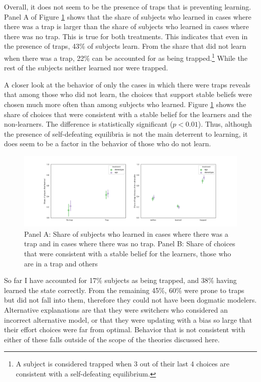 \documentclass[
  12pt,
]{article}
\begin{document}
Overall, it does not seem to be the presence of traps that is preventing
learning. Panel A of Figure \ref{fig:traps-choice} shows that the share
of subjects who learned in cases where there was a trap is larger than
the share of subjects who learned in cases where there was no trap. This
is true for both treatments. This indicates that even in the presence of
traps, 43\% of subjects learn. From the share that did not learn when
there was a trap, 22\% can be accounted for as being
trapped.\footnote{A subject is considered trapped when 3 out of their last 4 choices are consistent with 
a self-defeating equilibrium.} While the rest of the subjects neither
learned nor were trapped.

A closer look at the behavior of only the cases in which there were
traps reveals that among those who did not learn, the choices that
support stable beliefs were chosen much more often than among subjects
who learned. Figure \ref{fig:traps-choice} shows the share of choices
that were consistent with a stable belief for the learners and the
non-learners. The difference is statistically significant (\(p<0.01\)).
Thus, although the presence of self-defeating equilibria is not the main
deterrent to learning, it does seem to be a factor in the behavior of
those who do not learn.

\begin{figure}
\hypertarget{fig:traps-choice}{%
\centering
\includegraphics{../figures/trap_choice.png}
\caption{Panel A: Share of subjects who learned in cases where there was
a trap and in cases where there was no trap. Panel B: Share of choices
that were consistent with a stable belief for the learners, those who
are in a trap and others}\label{fig:traps-choice}
}
\end{figure}

So far I have accounted for 17\% subjects as being trapped, and 38\%
having learned the state correctly. From the remaining 45\%, 60\% were
prone to traps but did not fall into them, therefore they could not have
been dogmatic modelers. Alternative explanations are that they were
switchers who considered an incorrect alternative model, or that they
were updating with a bias so large that their effort choices were far
from optimal. Behavior that is not consistent with either of these falls
outside of the scope of the theories discussed here.
\end{document}
